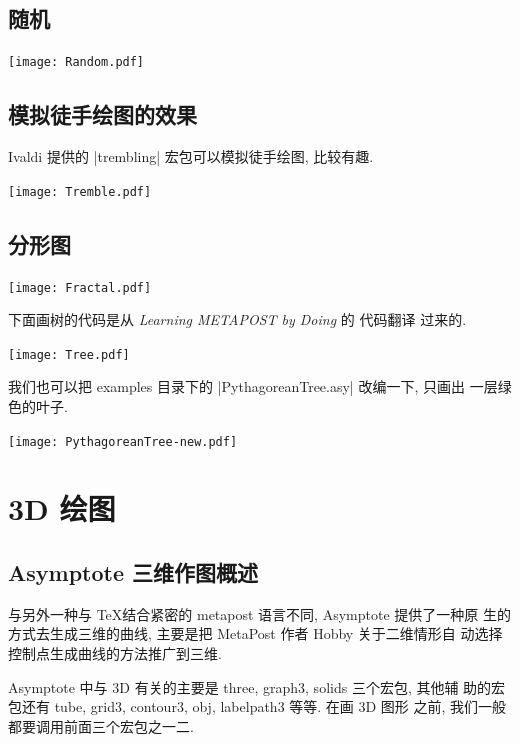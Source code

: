 \documentclass[nofonts,CJKnormalspaces]{ctexbook}[2009/05/20]
\begin{document}
\section{随机}
\begin{center}\texttt{[image: Random.pdf]}\end{center}%


\section{模拟徒手绘图的效果}
Ivaldi 提供的 |trembling| 宏包可以模拟徒手绘图, 比较有趣.
\begin{center}\texttt{[image: Tremble.pdf]}\end{center}%

\section{分形图}
\begin{center}\texttt{[image: Fractal.pdf]}\end{center}%

下面画树的代码是从 \emph{Learning METAPOST by Doing} 的 \MP{} 代码翻译
过来的.

\begin{center}\texttt{[image: Tree.pdf]}\end{center}%


我们也可以把 examples 目录下的  |PythagoreanTree.asy| 改编一下, 只画出
一层绿色的叶子.
\begin{center}\texttt{[image: PythagoreanTree-new.pdf]}\end{center}%



\chapter{3D 绘图}

\section{Asymptote 三维作图概述 }

与另外一种与 \TeX 结合紧密的 metapost 语言不同, Asymptote 提供了一种原
生的方式去生成三维的曲线, 主要是把 MetaPost 作者 Hobby 关于二维情形自
动选择控制点生成曲线的方法推广到三维.

Asymptote 中与 3D 有关的主要是 three, graph3, solids  三个宏包, 其他辅
助的宏包还有 tube, grid3, contour3, obj, labelpath3 等等. 在画 3D 图形
之前, 我们一般都要调用前面三个宏包之一二.
\end{document}
